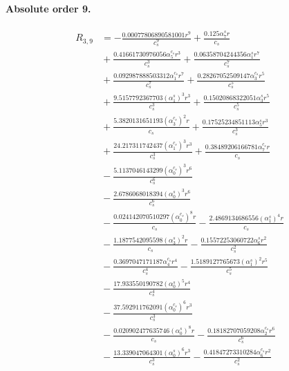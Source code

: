 \documentclass[10pt]{article}
\begin{document}
\paragraph{Absolute order 9.}
\begin{align*}
R_{3,9} &=  - \frac{0.00077806890581001 r^{9}}{c_{s}^{9}} + \frac{0.125 \alpha_{7}^s r}{c_{s}} \\
&{}  + \frac{0.41661730976056 \alpha_{5}^{c_s} r^{3}}{c_{s}^{3}} + \frac{0.06358704244356 \alpha_{1}^s r^{7}}{c_{s}^{7}} \\
&{}  + \frac{0.092987888503312 \alpha_{1}^{c_s} r^{7}}{c_{s}^{7}} + \frac{0.28267052509147 \alpha_{3}^{c_s} r^{5}}{c_{s}^{5}} \\
&{}  + \frac{9.5157792367703 \left(\alpha_{1}^s\right)^{3} r^{3}}{c_{s}^{3}} + \frac{0.15020868322051 \alpha_{3}^s r^{5}}{c_{s}^{5}} \\
&{}  + \frac{5.3820131651193 \left(\alpha_{3}^{c_s}\right)^{2} r}{c_{s}} + \frac{0.17525234851113 \alpha_{5}^s r^{3}}{c_{s}^{3}} \\
&{}  + \frac{24.217311742437 \left(\alpha_{1}^{c_s}\right)^{3} r^{3}}{c_{s}^{3}} + \frac{0.38489206166781 \alpha_{7}^{c_s} r}{c_{s}} \\
&{}  - \frac{5.1137046143299 \left(\alpha_{0}^{c_s}\right)^{3} r^{6}}{c_{s}^{6}} \\
&{}  - \frac{2.6786068018394 \left(\alpha_{0}^s\right)^{3} r^{6}}{c_{s}^{6}} \\
&{}  - \frac{0.024142070510297 \left(\alpha_{0}^{c_s}\right)^{8} r}{c_{s}} - \frac{2.4869134686556 \left(\alpha_{1}^s\right)^{4} r}{c_{s}} \\
&{}  - \frac{1.1877542095598 \left(\alpha_{3}^s\right)^{2} r}{c_{s}} - \frac{0.15572253060722 \alpha_{6}^s r^{2}}{c_{s}^{2}} \\
&{}  - \frac{0.3697047171187 \alpha_{4}^{c_s} r^{4}}{c_{s}^{4}} - \frac{1.5189127765673 \left(\alpha_{1}^s\right)^{2} r^{5}}{c_{s}^{5}} \\
&{}  - \frac{17.933550190782 \left(\alpha_{0}^s\right)^{5} r^{4}}{c_{s}^{4}} \\
&{}  - \frac{37.592911762091 \left(\alpha_{0}^{c_s}\right)^{6} r^{3}}{c_{s}^{3}} \\
&{}  - \frac{0.020902477635746 \left(\alpha_{0}^s\right)^{8} r}{c_{s}} - \frac{0.18182707059208 \alpha_{2}^{c_s} r^{6}}{c_{s}^{6}} \\
&{}  - \frac{13.339047064301 \left(\alpha_{0}^s\right)^{6} r^{3}}{c_{s}^{3}} - \frac{0.41847273310284 \alpha_{6}^{c_s} r^{2}}{c_{s}^{2}} \\

\end{align*}
\end{document}
